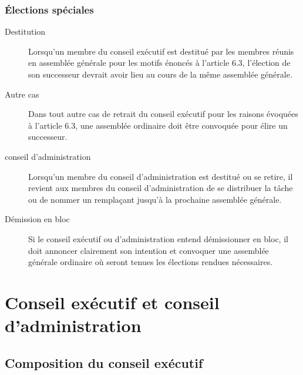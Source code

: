 \documentclass[12pt]{article}
\begin{document}
\subsubsection{Élections spéciales}

  \begin{description}
  \item[Destitution] Lorsqu'un membre du conseil exécutif est destitué par les membres réunis en assemblée générale pour les motifs énoncés à l'article 6.3, l'élection de son successeur devrait avoir lieu au cours de la même assemblée générale.
  \item[Autre cas] Dans tout autre cas de retrait du conseil exécutif pour les raisons évoquées à l'article 6.3, une assemblée ordinaire doit être convoquée pour élire un successeur.
  \item[conseil d'administration] Lorsqu'un membre du conseil d'administration est destitué ou se retire, il revient aux membres du conseil d'administration de se distribuer la tâche ou de nommer un remplaçant jusqu'à la prochaine assemblée générale.
  \item[Démission en bloc] Si le conseil exécutif ou d'administration entend démissionner en bloc, il doit annoncer clairement son intention et convoquer une assemblée générale ordinaire où seront tenues les élections rendues nécessaires.
  \end{description}


\section{Conseil exécutif et conseil d'administration}
\subsection{Composition du conseil exécutif}
\end{document}
